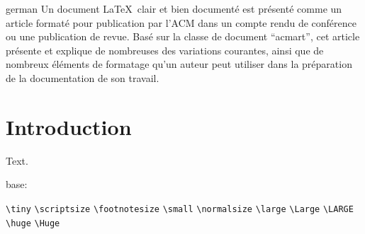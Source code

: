 \documentclass[sigconf, language=english, language=german,language=french]{acmart}
\begin{document}
\begin{translatedabstract}{german}
  Un document \LaTeX\ clair et bien documenté est présenté comme un
  article formaté pour publication par l'ACM dans un compte rendu de
  conférence ou une publication de revue. Basé sur la classe de
  document ``acmart'', cet article présente et explique de nombreuses
  des variations courantes, ainsi que de nombreux éléments de
  formatage qu'un auteur peut utiliser dans la préparation de la
  documentation de son travail.
\end{translatedabstract}

\maketitle
\section{Introduction}
Text.

\layout%

\makeatletter
base: \f@size

\verb+\tiny+ \tiny \f@size
\verb+\scriptsize+ \scriptsize \f@size
\verb+\footnotesize+ \footnotesize \f@size
\verb+\small+ \small \f@size
\verb+\normalsize+ \normalsize \f@size
\verb+\large+ \large \f@size
\verb+\Large+ \Large \f@size
\verb+\LARGE+ \LARGE \f@size
\verb+\huge+ \huge \f@size
\verb+\Huge+ \Huge \f@size
\makeatother
\end{document}
